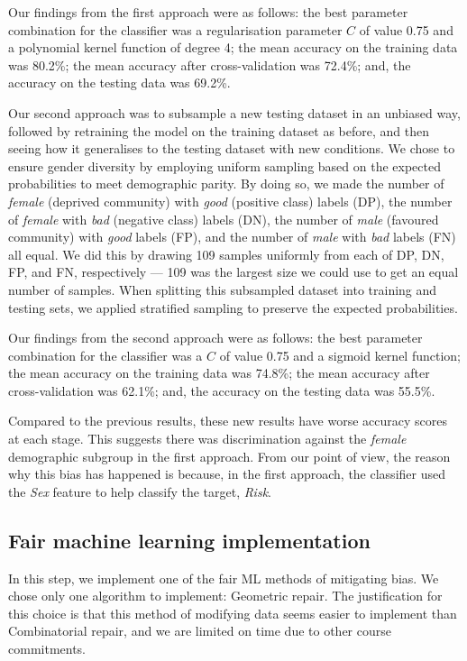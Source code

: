 \documentclass[conference]{IEEEtran}
\begin{document}
Our findings from the first approach were as follows: the best parameter combination for the classifier was a regularisation parameter $C$ of value 0.75 and a polynomial kernel function of degree 4; the mean accuracy on the training data was 80.2\%; the mean accuracy after cross-validation was 72.4\%; and, the accuracy on the testing data was 69.2\%.   

Our second approach was to subsample a new testing dataset in an unbiased way, followed by retraining the model on the training dataset as before, and then seeing how it generalises to the testing dataset with new conditions. We chose to ensure gender diversity by employing uniform sampling \cite{Kamiran2011} based on the expected probabilities to meet demographic parity. By doing so, we made the number of \emph{female} (deprived community) with \emph{good} (positive class) labels (DP), the number of \emph{female} with \emph{bad} (negative class) labels (DN), the number of \emph{male} (favoured community) with \emph{good} labels (FP), and the number of \emph{male} with \emph{bad} labels (FN) all equal. We did this by drawing 109 samples uniformly from each of DP, DN, FP, and FN, respectively --- 109 was the largest size we could use to get an equal number of samples. When splitting this subsampled dataset into training and testing sets, we applied stratified sampling to preserve the expected probabilities.

Our findings from the second approach were as follows: the best parameter combination for the classifier was a $C$ of value 0.75 and a sigmoid kernel function; the mean accuracy on the training data was 74.8\%; the mean accuracy after cross-validation was 62.1\%; and, the accuracy on the testing data was 55.5\%.

Compared to the previous results, these new results have worse accuracy scores at each stage. This suggests there was discrimination against the \emph{female} demographic subgroup in the first approach. From our point of view, the reason why this bias has happened is because, in the first approach, the classifier used the \emph{Sex} feature to help classify the target, \emph{Risk}.

\subsection{Fair machine learning implementation}
In this step, we implement one of the fair ML methods of mitigating bias. We chose only one algorithm to implement: Geometric repair. The justification for this choice is that this method of modifying data seems easier to implement than Combinatorial repair, and we are limited on time due to other course commitments.
\end{document}
